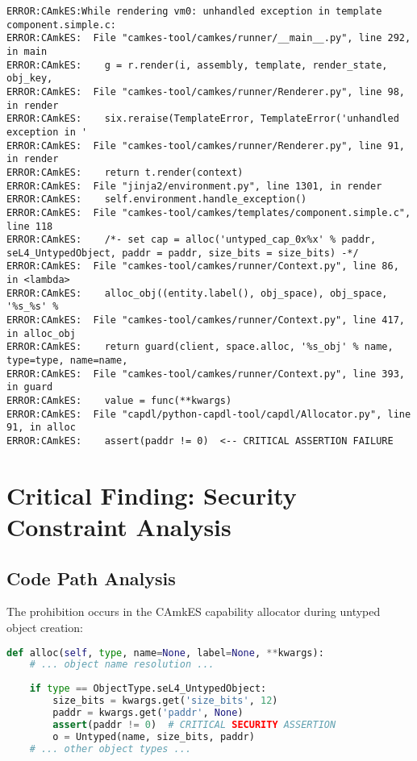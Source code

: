 \documentclass[11pt,a4paper]{article}
\begin{document}
\begin{lstlisting}[caption=CAmkES 0x0 Allocation Error]
ERROR:CAmkES:While rendering vm0: unhandled exception in template component.simple.c: 
ERROR:CAmkES:  File "camkes-tool/camkes/runner/__main__.py", line 292, in main
ERROR:CAmkES:    g = r.render(i, assembly, template, render_state, obj_key,
ERROR:CAmkES:  File "camkes-tool/camkes/runner/Renderer.py", line 98, in render
ERROR:CAmkES:    six.reraise(TemplateError, TemplateError('unhandled exception in '
ERROR:CAmkES:  File "camkes-tool/camkes/runner/Renderer.py", line 91, in render
ERROR:CAmkES:    return t.render(context)
ERROR:CAmkES:  File "jinja2/environment.py", line 1301, in render
ERROR:CAmkES:    self.environment.handle_exception()
ERROR:CAmkES:  File "camkes-tool/camkes/templates/component.simple.c", line 118
ERROR:CAmkES:    /*- set cap = alloc('untyped_cap_0x%x' % paddr, seL4_UntypedObject, paddr = paddr, size_bits = size_bits) -*/
ERROR:CAmkES:  File "camkes-tool/camkes/runner/Context.py", line 86, in <lambda>
ERROR:CAmkES:    alloc_obj((entity.label(), obj_space), obj_space, '%s_%s' %
ERROR:CAmkES:  File "camkes-tool/camkes/runner/Context.py", line 417, in alloc_obj
ERROR:CAmkES:    return guard(client, space.alloc, '%s_obj' % name, type=type, name=name,
ERROR:CAmkES:  File "camkes-tool/camkes/runner/Context.py", line 393, in guard
ERROR:CAmkES:    value = func(**kwargs)
ERROR:CAmkES:  File "capdl/python-capdl-tool/capdl/Allocator.py", line 91, in alloc
ERROR:CAmkES:    assert(paddr != 0)  <-- CRITICAL ASSERTION FAILURE
\end{lstlisting}

\section{Critical Finding: Security Constraint Analysis}

\subsection{Code Path Analysis}

The prohibition occurs in the CAmkES capability allocator during untyped object creation:

\begin{lstlisting}[language=Python,caption=capdl/Allocator.py - Untyped Object Allocation]
def alloc(self, type, name=None, label=None, **kwargs):
    # ... object name resolution ...
    
    if type == ObjectType.seL4_UntypedObject:
        size_bits = kwargs.get('size_bits', 12)
        paddr = kwargs.get('paddr', None)
        assert(paddr != 0)  # CRITICAL SECURITY ASSERTION
        o = Untyped(name, size_bits, paddr)
    # ... other object types ...
\end{lstlisting}
\end{document}
